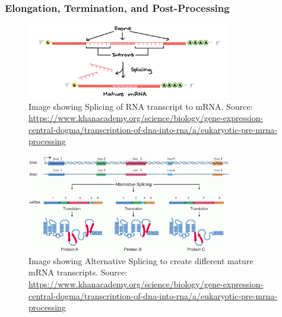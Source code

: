 \documentclass[letterpaper,12pt]{article}
\begin{document}
\subsubsection*{Elongation, Termination, and Post-Processing}
\begin{figure}[!h]
	\centering
	\includegraphics[width=0.8\textwidth]{figures/splicing.png}
	\caption{Image showing Splicing of RNA transcript to mRNA. Source: \url{https://www.khanacademy.org/science/biology/gene-expression-central-dogma/transcription-of-dna-into-rna/a/eukaryotic-pre-mrna-processing}}\label{fig:splicing}
\end{figure}
\begin{figure}[!h]
	\centering
	\includegraphics[width=0.8\textwidth]{figures/alternative_splicing.png}
	\caption{Image showing Alternative Splicing to create different mature mRNA transcripts. Source: \url{https://www.khanacademy.org/science/biology/gene-expression-central-dogma/transcription-of-dna-into-rna/a/eukaryotic-pre-mrna-processing}}\label{fig:alternative_splicing}
\end{figure}
\end{document}
